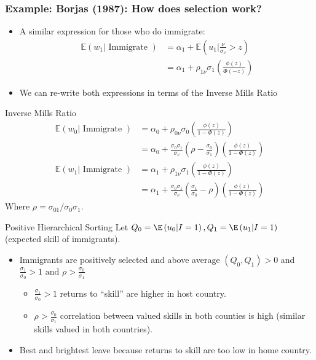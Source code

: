 \documentclass[aspectratio=169,11pt]{beamer}
\begin{document}
\begin{frame}
\frametitle{Example: Borjas (1987): How does selection work?}
\begin{itemize}
\item A similar expression for those who do immigrate:
\begin{align*}
\mathbb{E}\left(w_{1} | \text { Immigrate }\right) &=\alpha_{1}+\mathbb{E}\left(u_{1} | \frac{\nu}{\sigma_{\nu}}>z\right) \\
&=\alpha_{1}+\rho_{1 \nu} \sigma_{1}\left(\frac{\phi(z)}{\Phi(-z)}\right)
\end{align*}
\item We can re-write both expressions in terms of the \alert{Inverse Mills Ratio}
\end{itemize}
\end{frame}

\begin{frame}{Inverse Mills Ratio}
\begin{align*}
\mathbb{E}\left(w_{0} | \text { Immigrate }\right) &=\alpha_{0}+\rho_{0 \nu} \sigma_{0}\left(\frac{\phi(z)}{1-\Phi(z)}\right) \\
&=\alpha_{0}+\frac{\sigma_{0} \sigma_{1}}{\sigma_{\nu}}\left(\rho-\frac{\sigma_{0}}{\sigma_{1}}\right)\left(\frac{\phi(z)}{1-\Phi(z)}\right) \\
\mathbb{E}\left(w_{1} | \text { Immigrate }\right) &=\alpha_{1}+\rho_{1 \nu} \sigma_{1}\left(\frac{\phi(z)}{1-\Phi(z)}\right) \\
&=\alpha_{1}+\frac{\sigma_{0} \sigma_{1}}{\sigma_{\nu}}\left(\frac{\sigma_{1}}{\sigma_{0}}-\rho\right)\left(\frac{\phi(z)}{1-\Phi(z)}\right)
\end{align*}
Where $\rho=\sigma_{01} / \sigma_{0} \sigma_{1}$.
\end{frame}



\begin{frame}{Positive Hierarchical Sorting}
Let $Q_{0}=\E\left(u_{0} | I=1\right), Q_{1}=\E\left(u_{1} | I=1\right)$ (expected \alert{skill} of immigrants).
\begin{itemize}
\item Immigrants are positively selected and above average $(Q_0,Q_1) > 0$ and $\frac{\sigma_{1}}{\sigma_{0}}>1 \text { and } \rho>\frac{\sigma_{0}}{\sigma_{1}}$
\begin{itemize}
\item $\frac{\sigma_{1}}{\sigma_{0}}>1$ returns to ``skill'' are higher in host country.
\item $\rho>\frac{\sigma_{0}}{\sigma_{1}}$ correlation between valued skills in both counties is high (similar skills valued in both countries).
\end{itemize}
\item Best and brightest leave because returns to skill are too low in home country.
\end{itemize}
\end{frame}
\end{document}
